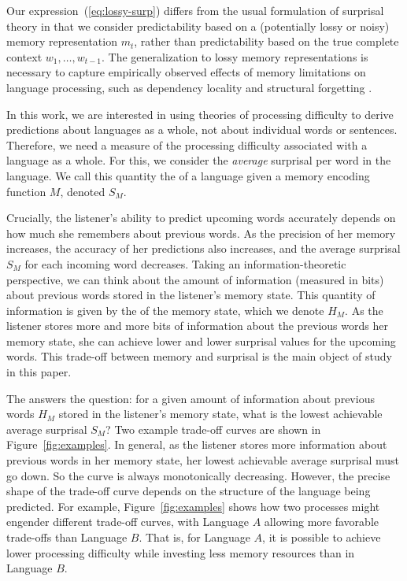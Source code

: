 Our expression~(\ref{eq:lossy-surp}) differs from the usual formulation of surprisal theory in that we consider predictability based on a (potentially lossy or noisy) memory representation $m_t$, rather than predictability based on the true complete context $w_1, \dots, w_{t-1}$. The generalization to lossy memory representations is necessary to capture empirically observed effects of memory limitations on language processing, such as dependency locality and structural forgetting \citep{futrell2020lossy}. %

In this work, we are interested in using theories of processing difficulty to derive predictions about languages as a whole, not about individual words or sentences. Therefore, we need a measure of the processing difficulty associated with a language as a whole. For this, we consider the \emph{average} surprisal per word in the language. We call this quantity the  of a language given a memory encoding function $M$, denoted $S_M$.

Crucially, the listener's ability to predict upcoming words accurately depends on how much she remembers about previous words. As the precision of her memory increases, the accuracy of her predictions also increases, and the average surprisal $S_M$ for each incoming word decreases. Taking an information-theoretic perspective, we can think about the amount of information (measured in bits) about previous words stored in the listener's memory state. This quantity of information is given by the  of the memory state, which we denote $H_M$. As the listener stores more and more bits of information about the previous words her memory state, she can achieve lower and lower surprisal values for the upcoming words. This trade-off between memory and surprisal is the main object of study in this paper.

The  answers the question: 
for a given amount of information about previous words $H_M$ stored in the listener's memory state, what is the lowest achievable average surprisal $S_M$? Two example trade-off curves are shown in Figure~\ref{fig:examples}. In general, as the listener stores more information about previous words in her memory state, her lowest achievable average surprisal must go down. So the curve is always monotonically decreasing. However, the precise shape of the trade-off curve depends on the structure of the language being predicted. For example, Figure~\ref{fig:examples} shows how two processes might engender different trade-off curves, with Language $A$ allowing more favorable trade-offs than Language $B$. That is, for Language $A$, it is possible to achieve lower processing difficulty while investing less memory resources than in Language $B$.

